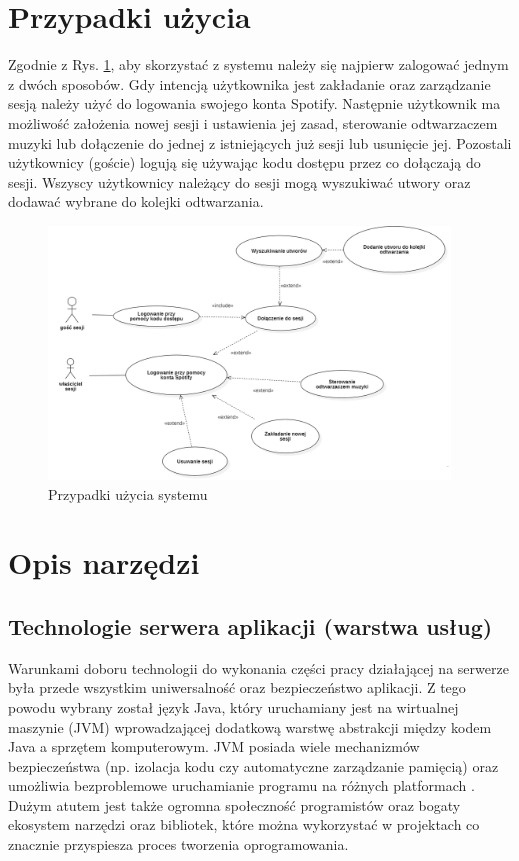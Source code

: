 \section{Przypadki użycia}
Zgodnie z Rys. \ref{fig:use-case}, aby skorzystać z systemu należy się najpierw zalogować jednym z dwóch sposobów. Gdy intencją użytkownika jest zakładanie oraz zarządzanie sesją należy użyć do logowania swojego konta Spotify. Następnie użytkownik ma możliwość założenia nowej sesji i ustawienia jej zasad, sterowanie odtwarzaczem muzyki lub dołączenie do jednej z istniejących już sesji lub usunięcie jej. Pozostali użytkownicy (goście) logują się używając kodu dostępu przez co dołączają do sesji. Wszyscy użytkownicy należący do sesji mogą wyszukiwać utwory oraz dodawać wybrane do kolejki odtwarzania.
\begin{figure}[h]
\centering
\includegraphics[width=0.95\textwidth]{./graf/przypadki_uzycia.PNG}
\caption{Przypadki użycia systemu}
\label{fig:use-case}
\end{figure}



\section{Opis narzędzi}

\subsection{Technologie serwera aplikacji (warstwa usług)}
Warunkami doboru technologii do wykonania części pracy działającej na serwerze była przede wszystkim uniwersalność oraz bezpieczeństwo aplikacji. Z tego powodu wybrany został język Java, który uruchamiany jest na wirtualnej maszynie (JVM) wprowadzającej dodatkową warstwę abstrakcji między kodem Java a sprzętem komputerowym. JVM posiada wiele mechanizmów bezpieczeństwa (np. izolacja kodu czy automatyczne zarządzanie pamięcią) oraz umożliwia bezproblemowe uruchamianie programu na różnych platformach \cite{bib:java_virtual_machine}. Dużym atutem jest także ogromna społeczność programistów oraz bogaty ekosystem narzędzi oraz bibliotek, które można wykorzystać w projektach co znacznie przyspiesza proces tworzenia oprogramowania.

